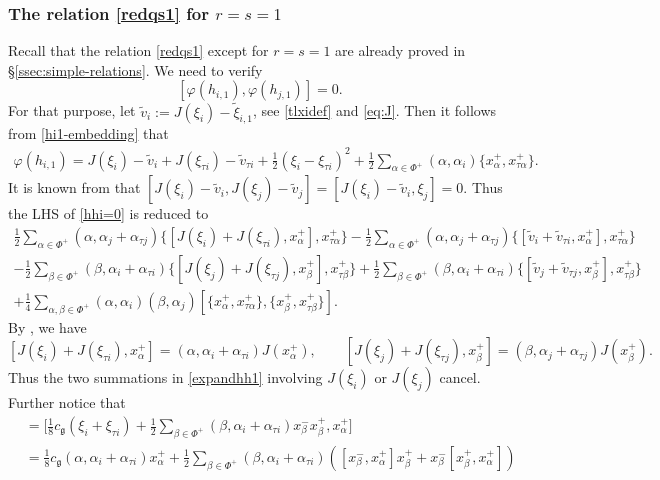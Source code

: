 \documentclass[11pt,reqno]{amsart}
\numberwithin{equation}{section}
\theoremstyle{definition}
\theoremstyle{remark}
\newcommand{\beq}{\begin{equation}}
\newcommand{\eeq}{\end{equation}}
\newcommand{\g}{\mathfrak{g}}
\begin{document}
\subsubsection{The relation \eqref{redqs1} for $r=s=1$} Recall that the relation \eqref{redqs1} except for $r=s=1$ are already proved in \S\ref{ssec:simple-relations}. We need to verify 
\beq \label{hhi=0}
[\varphi(h_{i,1}), \varphi(h_{j,1})] = 0 .
\eeq
For that purpose, let $\tilde{v}_i := J(\xi_i)-\tilde{\xi}_{i,1}$, see \eqref{tlxidef} and \eqref{eq:J}. Then it follows from \eqref{hi1-embedding} that
\begin{gather*}
\varphi(h_{i,1}) = J(\xi_i) - \tilde{v}_i
+ J(\xi_{\tau i}) - \tilde{v}_{\tau i} +\tfrac{1}{2}(\xi_i-\xi_{\tau i})^2 +\tfrac{1}{2}\sum_{\alpha \in \Phi^{+}}
(\alpha,\alpha_i)\{x_{\alpha}^{+}, x_{\tau\alpha}^+\}.
\end{gather*}
It is known from \cite[Theorem 2.6]{GRW19} that $[J(\xi_i)-\tilde{v}_i, J(\xi_j)-\tilde{v}_j]=[J(\xi_i)-\tilde{v}_i, \xi_j] = 0$. Thus the LHS of \eqref{hhi=0} is reduced to
\beq
\begin{split}\label{expandhh1}
    \tfrac{1}{2}\sum_{\alpha\in\Phi^+} (\alpha, \alpha_j+\alpha_{\tau j})\{[J(\xi_i)+J(\xi_{\tau i}), x_\alpha^+], x_{\tau \alpha}^+\} -\tfrac{1}{2}\sum_{\alpha\in\Phi^+}(\alpha, \alpha_j+\alpha_{\tau j})\{[\tilde{v}_i+\tilde{v}_{\tau i}, x_\alpha^+], x_{\tau\alpha}^+\} \\
    -\tfrac{1}{2}\sum_{\beta\in\Phi^+} (\beta, \alpha_i+\alpha_{\tau i})\{[J(\xi_j)+J(\xi_{\tau j}), x_\beta^+], x_{\tau \beta}^+\} +\tfrac{1}{2}\sum_{\beta\in\Phi^+}(\beta,\alpha_i+\alpha_{\tau i})\{[\tilde{v}_j+\tilde{v}_{\tau j}, x_\beta^+], x_{\tau\beta}^+\}\\
    +\tfrac{1}{4}\sum_{\alpha, \beta\in \Phi^+}(\alpha, \alpha_i)(\beta, \alpha_j)[\{x_\alpha^+, x_{\tau\alpha}^+\}, \{x_\beta^+, x_{\tau \beta}^+\}].
\end{split}
\eeq
By \cite[Proposition 3.21]{GNW18}, we have
\[
[J(\xi_i) + J(\xi_{\tau i}), x_\alpha^+]= (\alpha,\alpha_i+\alpha_{\tau i})J(x_\alpha^+),\qquad [J(\xi_j)+J(\xi_{\tau j}), x_\beta^+]=(\beta,\alpha_j+\alpha_{\tau j})J(x_\beta^+).
\]
Thus the two summations in \eqref{expandhh1} involving $J(\xi_i)$ or $J(\xi_j)$ cancel. Further notice that 
\begin{align*}
    [\tilde{v}_i+\tilde{v}_{\tau i}, x_\alpha^+]&=\Big[ \tfrac{1}{8}c_\g(\xi_i+\xi_{\tau i})+\tfrac{1}{2}\sum_{\beta\in\Phi^+}(\beta, \alpha_i+\alpha_{\tau i})x_\beta^-x_\beta^+,x_\alpha^+\Big]\\
    & = \tfrac{1}{8}c_\g(\alpha,\alpha_i+\alpha_{\tau i})x_\alpha^++\tfrac{1}{2}\sum_{\beta\in\Phi^+}(\beta, \alpha_i+\alpha_{\tau i})\left([x_\beta^-, x_\alpha^+]x_\beta^+ + x_\beta^-[x_\beta^+, x_\alpha^+]\right)
\end{align*}
\end{document}
